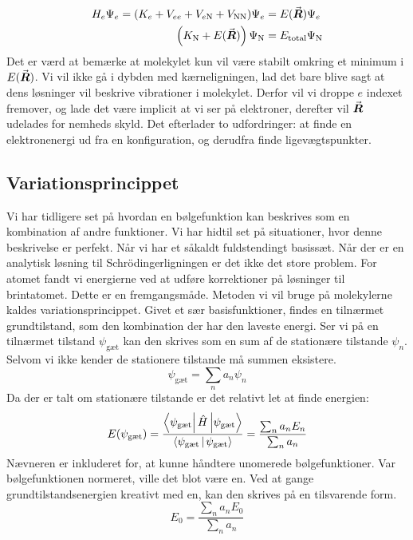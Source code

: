 \documentclass[../../Atom-ogMolekylefysik.tex]{subfiles}
\begin{document}
\begin{align}
    H_e\Psi_e = (K_e+V_{ee}+V_{e\text{N}}+V_\text{NN})\Psi_e&=E({\vec{\boldsymbol{R}}})\Psi_e\\
    \left(K_\text{N}+E({\vec{\boldsymbol{R}}})\right)\Psi_\text{N}&= E_\text{total}\Psi_\text{N}
\end{align}
Det er værd at bemærke at molekylet kun vil være stabilt omkring et minimum i $E({\vec{\boldsymbol{R}}})$. Vi vil ikke gå i dybden med kærneligningen, lad det bare blive sagt at dens løsninger vil beskrive vibrationer i molekylet. Derfor vil vi droppe $e$ indexet fremover, og lade det være implicit at vi ser på elektroner, derefter vil ${\vec{\boldsymbol{R}}}$ udelades for nemheds skyld. Det efterlader to udfordringer: at finde en elektronenergi ud fra en konfiguration, og derudfra finde ligevægtspunkter.

\subsection{Variationsprincippet}
Vi har tidligere set på hvordan en bølgefunktion kan beskrives som en kombination af andre funktioner. Vi har hidtil set på situationer, hvor denne beskrivelse er perfekt. Når vi har et såkaldt fuldstendingt basissæt. Når der er en analytisk løsning til Schrödingerligningen er det ikke det store problem. For atomet fandt vi energierne ved at udføre korrektioner på løsninger til brintatomet. Dette er en fremgangsmåde. Metoden vi vil bruge på molekylerne kaldes variationsprincippet. Givet et sær basisfunktioner, findes en tilnærmet grundtilstand, som den kombination der har den laveste energi. 
Ser vi på en tilnærmet tilstand $\psi_\text{gæt}$ kan den skrives som en sum af de stationære tilstande $\psi_n$. Selvom vi ikke kender de stationere tilstande må summen eksistere.
\begin{equation}
    \psi_\text{gæt} = \sum_na_n\psi_n
\end{equation}
Da der er talt om stationære tilstande er det relativt let at finde energien:
\begin{equation}
    E(\psi_\text{gæt})= \frac{\matrixel{\psi_\text{gæt}}{\op H}{\psi_\text{gæt}}}{\braket{\psi_\text{gæt}}{\psi_\text{gæt}}} = \frac{\sum_na_nE_n}{\sum_na_n}
\end{equation}
Nævneren er inkluderet for, at kunne håndtere unomerede bølgefunktioner. Var bølgefunktionen normeret, ville det blot være en. Ved at gange grundtilstandsenergien kreativt med en, kan den skrives på en tilsvarende form.
\begin{equation}
    E_0 = \frac{\sum_na_nE_0}{\sum_na_n}
\end{equation}
\end{document}
